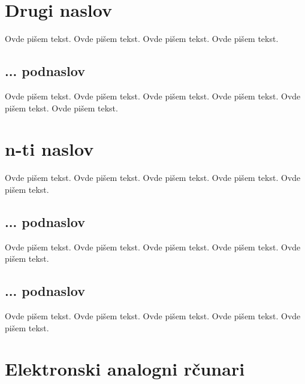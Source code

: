 \documentclass[a4paper]{article}
\begin{document}
{\section{Drugi naslov}
\label{sec:naslov2}

Ovde pišem tekst. 
Ovde pišem tekst. 
Ovde pišem tekst. 
Ovde pišem tekst. 

\subsection{... podnaslov}
\label{subsec:podnaslovN}

Ovde pišem tekst. 
Ovde pišem tekst. 
Ovde pišem tekst. 
Ovde pišem tekst. 
Ovde pišem tekst. 
Ovde pišem tekst. 

\section{n-ti naslov}
\label{sec:naslovN}

Ovde pišem tekst. 
Ovde pišem tekst. 
Ovde pišem tekst. 
Ovde pišem tekst. 
Ovde pišem tekst. 

\subsection{... podnaslov}
\label{subsec:podnaslovK}

Ovde pišem tekst. 
Ovde pišem tekst. 
Ovde pišem tekst. 
Ovde pišem tekst. 
Ovde pišem tekst. 

\subsection{... podnaslov}
\label{subsec:podnaslovM}

Ovde pišem tekst. 
Ovde pišem tekst. 
Ovde pišem tekst. 
Ovde pišem tekst. 
Ovde pišem tekst. 

\section{Elektronski analogni rčunari}
		\label{sec:naslov4}
		
}
\end{document}
